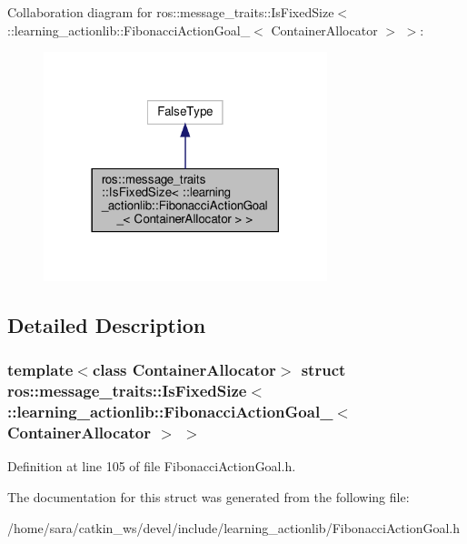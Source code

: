 Collaboration diagram for ros\+:\+:message\+\_\+traits\+:\+:Is\+Fixed\+Size$<$ \+:\+:learning\+\_\+actionlib\+:\+:Fibonacci\+Action\+Goal\+\_\+$<$ Container\+Allocator $>$ $>$\+:
\nopagebreak
\begin{figure}[H]
\begin{center}
\leavevmode
\includegraphics[width=234pt]{structros_1_1message__traits_1_1IsFixedSize_3_01_1_1learning__actionlib_1_1FibonacciActionGoal__0bf0a3e74f01193b9842be1aa443dd95}
\end{center}
\end{figure}


\subsection{Detailed Description}
\subsubsection*{template$<$class Container\+Allocator$>$\newline
struct ros\+::message\+\_\+traits\+::\+Is\+Fixed\+Size$<$ \+::learning\+\_\+actionlib\+::\+Fibonacci\+Action\+Goal\+\_\+$<$ Container\+Allocator $>$ $>$}



Definition at line 105 of file Fibonacci\+Action\+Goal.\+h.



The documentation for this struct was generated from the following file\+:\begin{DoxyCompactItemize}
\item 
/home/sara/catkin\+\_\+ws/devel/include/learning\+\_\+actionlib/Fibonacci\+Action\+Goal.\+h\end{DoxyCompactItemize}

